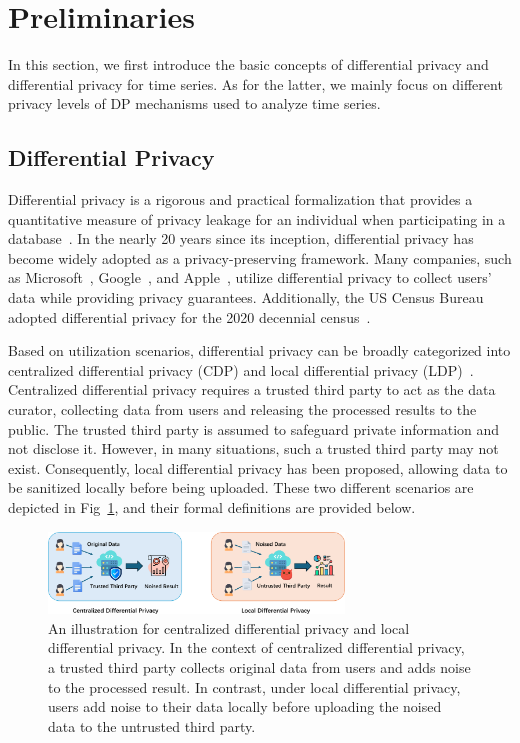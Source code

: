 \section{Preliminaries}\label{sec2}
In this section, we first introduce the basic concepts of differential privacy and differential privacy for time series. As for the latter, we mainly focus on different privacy levels of DP mechanisms used to analyze time series.

\subsection{Differential Privacy}
Differential privacy is a rigorous and practical formalization that provides a quantitative measure of privacy leakage for an individual when participating in a database~\cite{Dwork2006}. In the nearly 20 years since its inception, differential privacy has become widely adopted as a privacy-preserving framework. Many companies, such as Microsoft~\cite{Ding2017}, Google~\cite{Erlingsson2014}, and Apple~\cite{Thakurta2017}, utilize differential privacy to collect users' data while providing privacy guarantees.  Additionally, the US Census Bureau adopted differential privacy for the 2020 decennial census~\cite{Dwork2019}.

Based on utilization scenarios, differential privacy can be broadly categorized into centralized differential privacy (CDP) and local differential privacy (LDP)~\cite{Yang2023}. Centralized differential privacy requires a trusted third party to act as the data curator, collecting data from users and releasing the processed results to the public. The trusted third party is assumed to safeguard private information and not disclose it. However, in many situations, such a trusted third party may not exist.  Consequently, local differential privacy has been proposed, allowing data to be sanitized locally before being uploaded. These two different  scenarios are depicted in Fig~\ref{cdp-ldp}, and their formal definitions are provided below.

\begin{figure}[htbp]
	\centering
		\includegraphics[width=0.7\textwidth]{submissions/submission4/figs/02-pre/cdp-ldp-crop.pdf}
	\caption{An illustration for centralized differential privacy and local differential privacy. In the context of centralized differential privacy, a trusted third party collects original data from users and adds noise to the processed result. In contrast, under  local differential privacy, users add noise to their data locally before uploading the noised data to the untrusted third party.}
	\label{cdp-ldp}
\end{figure}

